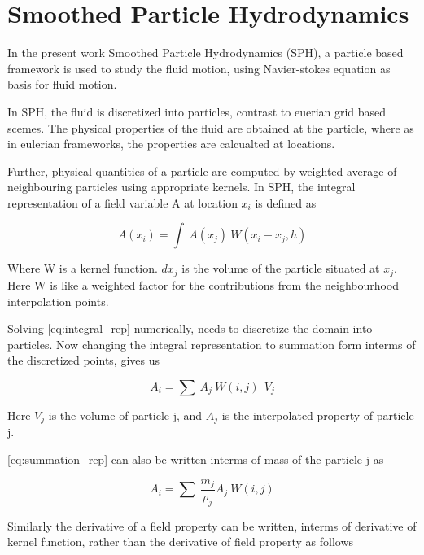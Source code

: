 \chapter{Smoothed Particle Hydrodynamics}
\label{chap:SPH}

In the present work Smoothed Particle Hydrodynamics (SPH), a particle based
framework is used to study the fluid motion, using Navier-stokes
equation as basis for fluid motion.

In SPH, the fluid is discretized into particles, contrast to euerian
grid based scemes. The physical properties of the fluid are obtained
at the particle, where as in eulerian frameworks, the properties are
calcualted at locations.

Further, physical quantities of a particle are computed by weighted
average of neighbouring particles using appropriate kernels. In SPH,
the integral representation of a field variable A at location $x_i$ is
defined as

\begin{equation}
  \label{eq:integral_rep}
  A(x_i) = \int\> A(x_j) \>W(x_i - x_j, h)
\end{equation}

Where W is a kernel function. $dx_{j}$ is the volume of the particle
situated at $x_j$. Here W is like a weighted factor for the
contributions from the neighbourhood interpolation points.

Solving \eqref{eq:integral_rep} numerically, needs to discretize the
domain into particles. Now changing the integral representation to
summation form interms of the discretized points, gives us

\begin{equation}
  \label{eq:summation_rep}
  A_i = \sum\> A_j\> W(i,j)\>\> V_j
\end{equation}

Here $V_j$ is the volume of particle j, and $A_j$ is the interpolated
property of particle j.

\eqref{eq:summation_rep} can also be written interms of mass of the particle j
as

\begin{equation}
  \label{eq:summation_mass_rep}
  A_i = \sum\> \frac{m_j}{\rho_j} A_j\> W(i,j)
\end{equation}

Similarly the derivative of a field property can be written, interms
of derivative of kernel function, rather than the derivative of field
property as follows


